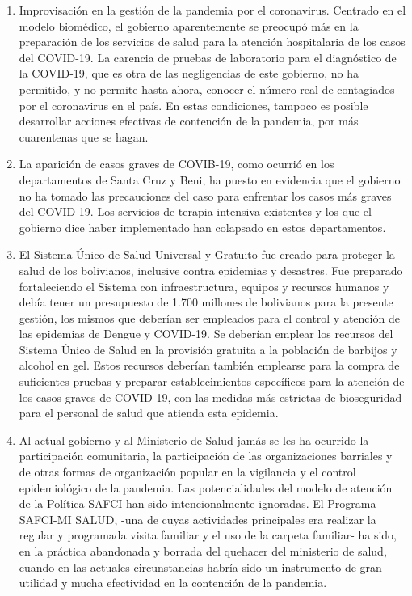 \documentclass[a4paper, nobind]{templates/ociamthesis}
\begin{document}
\begin{enumerate}
\item
  Improvisación en la gestión de la pandemia por el coronavirus. Centrado en el modelo biomédico, el gobierno aparentemente se preocupó más en la preparación de los servicios de salud para la atención hospitalaria de los casos del COVID-19. La carencia de pruebas de laboratorio para el diagnóstico de la COVID-19, que es otra de las negligencias de este gobierno, no ha permitido, y no permite hasta ahora, conocer el número real de contagiados por el coronavirus en el país. En estas condiciones, tampoco es posible desarrollar acciones efectivas de contención de la pandemia, por más cuarentenas que se hagan.
\item
  La aparición de casos graves de COVIB-19, como ocurrió en los departamentos de Santa Cruz y Beni, ha puesto en evidencia que el gobierno no ha tomado las precauciones del caso para enfrentar los casos más graves del COVID-19. Los servicios de terapia intensiva existentes y los que el gobierno dice haber implementado han colapsado en estos departamentos.
\item
  El Sistema Único de Salud Universal y Gratuito fue creado para proteger la salud de los bolivianos, inclusive contra epidemias y desastres. Fue preparado fortaleciendo el Sistema con infraestructura, equipos y recursos humanos y debía tener un presupuesto de 1.700 millones de bolivianos para la presente gestión, los mismos que deberían ser empleados para el control y atención de las epidemias de Dengue y COVID-19. Se deberían emplear los recursos del Sistema Único de Salud en la provisión gratuita a la población de barbijos y alcohol en gel. Estos recursos deberían también emplearse para la compra de suficientes pruebas y preparar establecimientos específicos para la atención de los casos graves de COVID-19, con las medidas más estrictas de bioseguridad para el personal de salud que atienda esta epidemia.
\item
  Al actual gobierno y al Ministerio de Salud jamás se les ha ocurrido la participación comunitaria, la participación de las organizaciones barriales y de otras formas de organización popular en la vigilancia y el control epidemiológico de la pandemia. Las potencialidades del modelo de atención de la Política SAFCI han sido intencionalmente ignoradas. El Programa SAFCI-MI SALUD, -una de cuyas actividades principales era realizar la regular y programada visita familiar y el uso de la carpeta familiar- ha sido, en la práctica abandonada y borrada del quehacer del ministerio de salud, cuando en las actuales circunstancias habría sido un instrumento de gran utilidad y mucha efectividad en la contención de la pandemia.
\end{enumerate}
\end{document}
